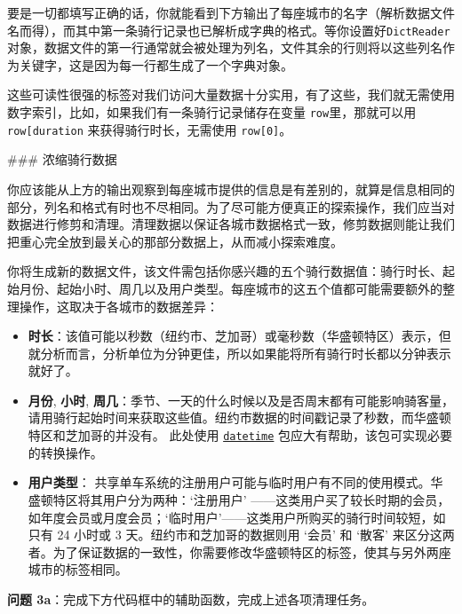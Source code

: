 \documentclass[11pt]{article}
\providecommand{\tightlist}{%
      \setlength{\itemsep}{0pt}\setlength{\parskip}{0pt}}
\begin{document}
    要是一切都填写正确的话，你就能看到下方输出了每座城市的名字（解析数据文件名而得），而其中第一条骑行记录也已解析成字典的格式。等你设置好\texttt{DictReader}对象，数据文件的第一行通常就会被处理为列名，文件其余的行则将以这些列名作为关键字，这是因为每一行都生成了一个字典对象。

这些可读性很强的标签对我们访问大量数据十分实用，有了这些，我们就无需使用数字索引，比如，如果我们有一条骑行记录储存在变量
\texttt{row}里，那就可以用
\texttt{row{[}\textquotesingle{}duration\textquotesingle{}{]}}
来获得骑行时长，无需使用 \texttt{row{[}0{]}}。

 \#\#\# 浓缩骑行数据

你应该能从上方的输出观察到每座城市提供的信息是有差别的，就算是信息相同的部分，列名和格式有时也不尽相同。为了尽可能方便真正的探索操作，我们应当对数据进行修剪和清理。清理数据以保证各城市数据格式一致，修剪数据则能让我们把重心完全放到最关心的那部分数据上，从而减小探索难度。

你将生成新的数据文件，该文件需包括你感兴趣的五个骑行数据值：骑行时长、起始月份、起始小时、周几以及用户类型。每座城市的这五个值都可能需要额外的整理操作，这取决于各城市的数据差异：

\begin{itemize}
\tightlist
\item
  \textbf{时长}：该值可能以秒数（纽约市、芝加哥）或毫秒数（华盛顿特区）表示，但就分析而言，分析单位为分钟更佳，所以如果能将所有骑行时长都以分钟表示就好了。
\item
  \textbf{月份}, \textbf{小时},
  \textbf{周几}：季节、一天的什么时候以及是否周末都有可能影响骑客量，请用骑行起始时间来获取这些值。纽约市数据的时间戳记录了秒数，而华盛顿特区和芝加哥的并没有。
  此处使用
  \href{https://docs.python.org/3/library/datetime.html}{\texttt{datetime}}
  包应大有帮助，该包可实现必要的转换操作。
\item
  \textbf{用户类型}：
  共享单车系统的注册用户可能与临时用户有不同的使用模式。华盛顿特区将其用户分为两种：`注册用户'
  ------这类用户买了较长时期的会员，如年度会员或月度会员；`临时用户'------这类用户所购买的骑行时间较短，如只有
  24 小时或 3 天。纽约市和芝加哥的数据则用 `会员' 和 `散客'
  来区分这两者。为了保证数据的一致性，你需要修改华盛顿特区的标签，使其与另外两座城市的标签相同。
\end{itemize}

\textbf{问题 3a}：完成下方代码框中的辅助函数，完成上述各项清理任务。
\end{document}

